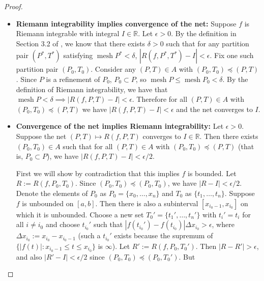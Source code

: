 \begin{proof}



\begin{itemize}

\item \textbf{Riemann integrability implies convergence of the net:} Suppose \(f\) is Riemann integrable with integral \(I \in \mathbb{R}\). Let \(\epsilon > 0\). By the definition in Section 3.2 of \citet{pugh2015real}, we know that there exists \(\delta > 0\) such that for any partition pair \((P^*,T^*)\) satisfying \(\operatorname{mesh}P^* < \delta\), \(|R(f, P^*, T^*) - I | < \epsilon\). Fix one such partition pair \((P_0, T_0)\). Consider any \((P, T) \in A\) with \((P_0, T_0) \preceq (P,T)\). Since \(P\) is a refinement of \(P_0\), \(P_0 \subset P\), so \(\operatorname{mesh}P \leq \operatorname{mesh}P_0 < \delta\). By the definition of Riemann integrability, we have that \(\operatorname{mesh}P < \delta \implies |R(f, P,T) - I| < \epsilon\). Therefore for all \((P, T) \in A\) with \((P_0, T_0) \preceq (P,T)\) we have \(|R(f, P,T) - I| < \epsilon\) and the net converges to \(I\).






\item \textbf{Convergence of the net implies Riemann integrability:} Let \(\epsilon > 0\). Suppose the net \((P,T) \mapsto R(f,P,T)\) converges to \(I \in \mathbb{R}\). Then there exists \((P_0, T_0) \in A\) such that for all \((P, T) \in A\) with \((P_0, T_0) \preceq (P,T)\) (that is, \(P_0 \subset P\)), we have \(|R(f, P,T) - I| < \epsilon/2\).

First we will show by contradiction that this implies \(f\) is bounded. Let \(R:= R(f, P_0,T_0)\). Since \( (P_0, T_0) \preceq (P_0, T_0)\), we have \(|R - I| < \epsilon/2\). Denote the elements of \(P_0\) as \(P_0 = \{x_0, \ldots, x_{n}\}\) and \(T_0\) as \(\{t_1, \ldots, t_n\}\).  Suppose \(f\) is unbounded on \([a,b]\). Then there is also a subinterval \([x_{i_0 -1}, x_{i_0}]\) on which it is unbounded. Choose a new set \(T_0' = \{t_1', \ldots, t_n'\}\) with \(t_i' = t_i\) for all \(i \neq i_0\) and choose \(t_{i_0}'\) such that \(|f(t_{i_0}') - f(t_{i_0}) | \Delta x_{i_0} > \epsilon\), where \(\Delta x_{i_0} := x_{i_0} - x_{i_0 - 1} \) (such a \(t_{i_0}'\) exists because the supremum of \(\{|f(t)|: x_{i_0 - 1} \leq t \leq x_{i_0} \}\) is \(\infty\)). Let \(R' := R(f, P_0, T_0')\). Then \(|R - R'| > \epsilon\), and also \(|R ' - I| < \epsilon/2\) since \((P_0, T_0) \preceq (P_0, T_0')\). But


\end{itemize}
\end{proof}
